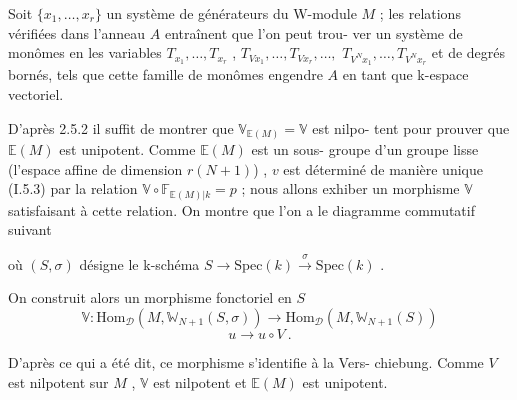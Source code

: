 
Soit $\{x_1,\dots,x_r\}$ un système de générateurs du W-module $M$ ;
les relations vérifiées dans l'anneau $A$ entraînent que l'on peut trou-%
ver un système de monômes en les variables $T_{x_1},\dots,T_{x_r}$ , $T_{Vx_1},\dots,T_{Vx_r},\dots,$
$T_{V^Nx_1},\dots,T_{V^Nx_r}$ et de degrés bornés, tels que cette famille de monômes
engendre $A$ en tant que k-espace vectoriel.

D'après 2.5.2 il suffit de montrer que $\mathbb{V}_{\mathbb{E}(M)} = \mathbb{V}$ est nilpo-%
tent pour prouver que $\mathbb{E}(M)$ est unipotent. Comme $\mathbb{E}(M)$ est un sous-%
groupe d'un groupe lisse (l'espace affine de dimension $r(N+1)$) , $v$ est
déterminé de manière unique (I.5.3) par la relation $\mathbb{V}\circ\mathbb{F}_{\mathbb{E}(M)|k} = p$ ;
nous allons exhiber un morphisme $\mathbb{V}$ satisfaisant à cette relation. On
montre que l'on a le diagramme commutatif suivant


où $(S,\sigma)$ désigne le k-schéma $S \to \mathrm{Spec}(k) \overset{\sigma}{\to} \mathrm{Spec}(k)$ .

On construit alors un morphisme fonctoriel en $S$
\[ \mathbb{V} : \mathrm{Hom}_{\mathcal{D}}(M,\mathbb{W}_{N+1}(S,\sigma)) \to \mathrm{Hom}_{\mathcal{D}}(M,\mathbb{W}_{N+1}(S)) \]
\[ u \to u \circ V \ . \]

D'après ce qui a été dit, ce morphisme s'identifie à la Vers-%
chiebung. Comme $V$ est nilpotent sur $M$ , $\mathbb{V}$ est nilpotent et $\mathbb{E}(M)$
est unipotent.

